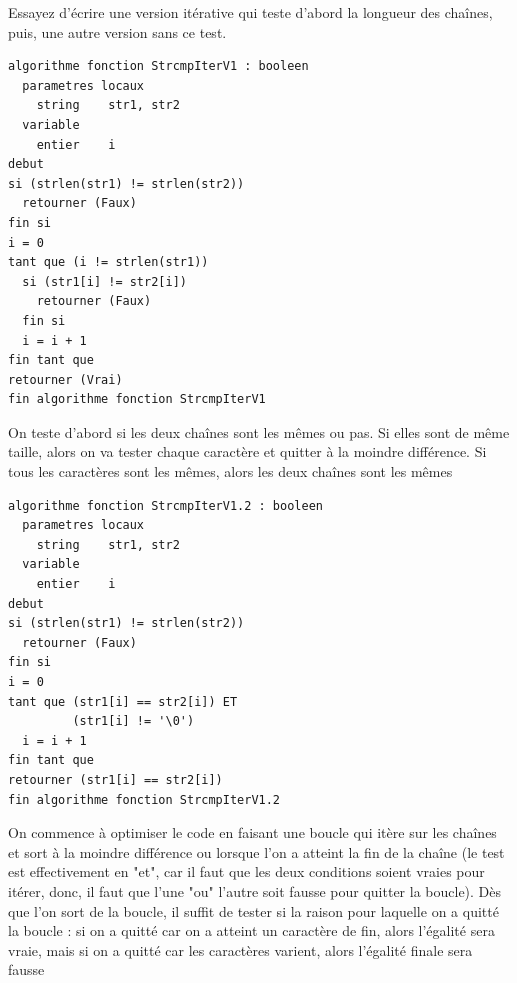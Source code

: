 \documentclass[11pt,a4paper]{article}
\begin{document}
\vfillLast


\newpage

\vfillFirst


Essayez d'écrire une version itérative qui teste d'abord la longueur des chaînes, puis, une autre version sans ce test.

\begin{table}[ht!]
  \centering
\begin{lstlisting}[style=algorithmique]
algorithme fonction StrcmpIterV1 : booleen
  parametres locaux
    string    str1, str2
  variable
    entier    i
debut
si (strlen(str1) != strlen(str2))
  retourner (Faux)
fin si
i = 0
tant que (i != strlen(str1))
  si (str1[i] != str2[i])
    retourner (Faux)
  fin si
  i = i + 1
fin tant que
retourner (Vrai)
fin algorithme fonction StrcmpIterV1 \end{lstlisting}
  \caption{On teste d'abord si les deux chaînes sont les mêmes ou pas. Si elles sont de même taille, alors on va tester chaque caractère et quitter à la moindre différence. Si tous les caractères sont les mêmes, alors les deux chaînes sont les mêmes}
\end{table}

\vfillLast

\newpage

\begin{table}[ht!]
  \centering
\begin{lstlisting}[style=algorithmique]
algorithme fonction StrcmpIterV1.2 : booleen
  parametres locaux
    string    str1, str2
  variable
    entier    i
debut
si (strlen(str1) != strlen(str2))
  retourner (Faux)
fin si
i = 0
tant que (str1[i] == str2[i]) ET
         (str1[i] != '\0')
  i = i + 1
fin tant que
retourner (str1[i] == str2[i])
fin algorithme fonction StrcmpIterV1.2 \end{lstlisting}
  \caption{On commence à optimiser le code en faisant une boucle qui itère sur les chaînes et sort à la moindre différence ou lorsque l'on a atteint la fin de la chaîne (le test est effectivement en "et", car il faut que les deux conditions soient vraies pour itérer, donc, il faut que l'une "ou" l'autre soit fausse pour quitter la boucle). Dès que l'on sort de la boucle, il suffit de tester si la raison pour laquelle on a quitté la boucle : si on a quitté car on a atteint un caractère de fin, alors l'égalité sera vraie, mais si on a quitté car les caractères varient, alors l'égalité finale sera fausse}
\end{table}
\end{document}
